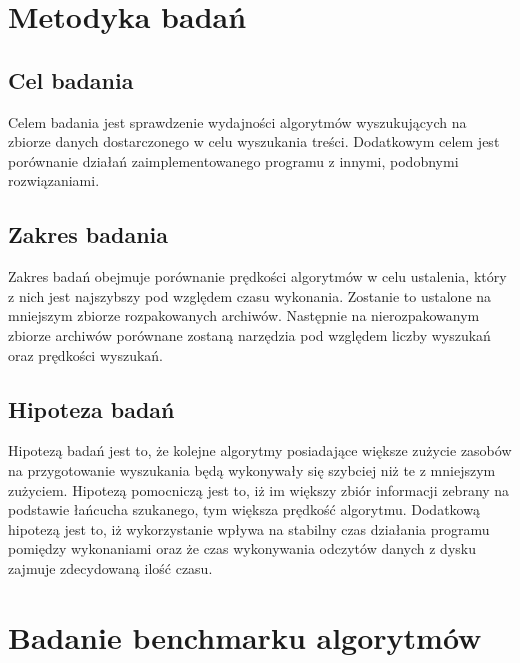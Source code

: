 \section{Metodyka badań}

\subsection{Cel badania}

Celem badania jest sprawdzenie wydajności algorytmów wyszukujących na zbiorze
danych dostarczonego w celu wyszukania treści. Dodatkowym celem jest porównanie
działań zaimplementowanego programu z innymi, podobnymi rozwiązaniami.

\subsection{Zakres badania}

Zakres badań obejmuje porównanie prędkości algorytmów w celu ustalenia, który
z nich jest najszybszy pod względem czasu wykonania. Zostanie to ustalone na
mniejszym zbiorze rozpakowanych archiwów. Następnie na nierozpakowanym zbiorze
archiwów porównane zostaną narzędzia pod względem liczby wyszukań oraz prędkości
wyszukań.

\subsection{Hipoteza badań}

Hipotezą badań jest to, że kolejne algorytmy posiadające większe zużycie zasobów
na przygotowanie wyszukania będą wykonywały się szybciej niż te z mniejszym
zużyciem. Hipotezą pomocniczą jest to, iż im większy zbiór informacji zebrany
na podstawie łańcucha szukanego, tym większa prędkość algorytmu. Dodatkową hipotezą jest
to, iż wykorzystanie  wpływa na stabilny czas
działania programu pomiędzy wykonaniami oraz że czas wykonywania odczytów danych z dysku zajmuje
zdecydowaną ilość czasu.

\section{Badanie benchmarku algorytmów}

